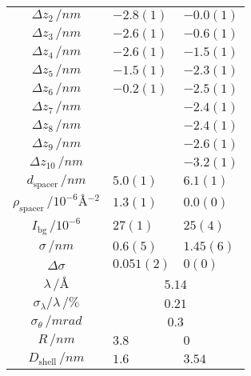 \documentclass[\main/dresen_thesis.tex]{subfiles}
\begin{document}
\begin{table}[!htbp]
\begin{tabular}{ c | l | l }
       $\Delta z_2 \, / \unit{nm} $                                 & $-2.8(1)$        & $-0.0(1)$ \\
       $\Delta z_3 \, / \unit{nm} $                                 & $-2.6(1)$        & $-0.6(1)$ \\
       $\Delta z_4 \, / \unit{nm} $                                 & $-2.6(1)$        & $-1.5(1)$ \\
       $\Delta z_5 \, / \unit{nm} $                                 & $-1.5(1)$        & $-2.3(1)$ \\
       $\Delta z_6 \, / \unit{nm} $                                 & $-0.2(1)$       & $-2.5(1)$ \\
       $\Delta z_7 \, / \unit{nm} $                                 &                   & $-2.4(1)$ \\
       $\Delta z_8 \, / \unit{nm} $                                 &                   & $-2.4(1)$   \\
       $\Delta z_9 \, / \unit{nm} $                                 &                   & $-2.6(1)$    \\
       $\Delta z_{10} \, / \unit{nm} $                              &                   & $-3.2(1)$   \\
       \hline
       $d_\mathrm{spacer}   \, / \unit{nm} $                        & $5.0(1)$          & $6.1(1)$  \\
       $\rho_\mathrm{spacer}\, / \unit{10^{-6} \angstrom^{-2}} $    & $1.3(1)$          & $0.0(0)$ \\
       $I_\mathrm{bg}\, / \unit{10^{-6}}$                           & $27(1)$          & $25(4)$ \\
       $\sigma     \, / \unit{nm} $                                 & $0.6(5)$          & $1.45(6)$  \\
       $\Delta \sigma$                                              & $0.051(2)$        & $0(0)$ \\
       $\lambda \, / \unit{\angstrom}$                              & \multicolumn{2}{c}{$5.14$} \\
       $\sigma_\lambda / \lambda\, / \unit{\%}$                     & \multicolumn{2}{c}{$0.21$} \\
       $\sigma_\theta \, / \unit{mrad}$                             & \multicolumn{2}{c}{$0.3$} \\
      \hline
       $R             \, / \unit{nm}$                               & $3.8$         & $0$ \\
       $D_\mathrm{shell} \, / \unit{nm}$                            & $1.6$         & $3.54$ \\

\end{tabular}
\end{table}
\end{document}
